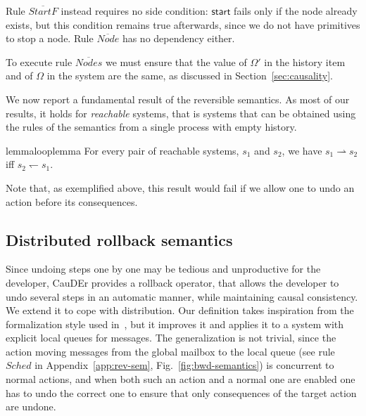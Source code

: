 \documentclass[runningheads]{llncs}
\newcommand{\ms}[1]{\mathsf{#1}}
\newcommand{\lh}{\leftharpoondown}
\newcommand{\rh}{\rightharpoonup}
\newcommand{\ol}[1]{\overline{#1}}
\begin{document}
Rule $\ol{StartF}$ instead requires no side condition: $\ms{start}$ fails
only if the node already exists, but this condition remains true afterwards,
since we do not have primitives to stop a node. Rule $\ol{Node}$ has
no dependency either.

To execute rule $\ol{Nodes}$ we must ensure that the value of $\Omega'$ in the history item and of $\Omega$ in the system are the same, as discussed in Section~\ref{sec:causality}.

We now report a fundamental result of the reversible
semantics. As most of our results, it holds for \emph{reachable} systems, that is systems that can be obtained using the rules of the semantics from a single process with empty history.

\begin{restatable}{lemma}{looplemma}
  For every pair of reachable systems, $s_1$ and $s_2$, we have $s_1
  \rh s_2$ iff $s_2 \lh s_1$.
\end{restatable}
Note that, as exemplified above, this result would fail if we allow
one to undo an action before its consequences.

\subsection{Distributed rollback semantics}

Since undoing steps one by one may be tedious and unproductive for the
developer, CauDEr provides a rollback operator, that allows the
developer to undo several steps in an automatic manner, while
maintaining causal consistency. We extend it to cope with
distribution.  Our definition takes inspiration from the
formalization style used in~\cite{LanesePV21}, but it
improves it and applies it to a system with explicit local
queues for messages. The generalization is not trivial, since the action moving
messages from the global mailbox to the local queue (see rule $Sched$ in
Appendix~\ref{app:rev-sem}, Fig.~\ref{fig:bwd-semantics}) is concurrent to normal actions, and when
both such an action and a normal one are enabled one has to undo the
correct one to ensure that only consequences of the target action are
undone.
\end{document}
